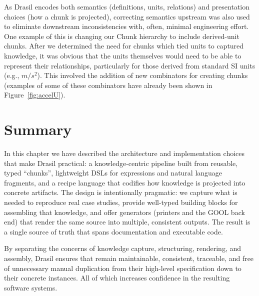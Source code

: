 As Drasil encodes both semantics (definitions, units, relations) and 
presentation choices (how a chunk is projected), correcting semantics upstream 
was also used to eliminate downstream inconsistencies with, often, minimal 
engineering effort. One example of this is changing our Chunk hierarchy to 
include derived-unit chunks. After we determined the need for  
chunks which tied units to captured knowledge, it was obvious that the units 
themselves would need to be able to represent their relationships, particularly 
for those derived from standard SI units (e.g., $m/s^2$). This involved the
addition of new combinators for creating  chunks (examples of 
some of these combinators have already been shown in Figure~\ref{fig:accelU}).


\section{Summary}
\label{sec:drasil_summary}

In this chapter we have described the architecture and implementation choices 
that make Drasil practical: a knowledge-centric pipeline built from reusable, 
typed ``chunks'', lightweight DSLs for expressions and natural language 
fragments, and a recipe language that codifies how knowledge is projected into 
concrete artifacts. The design is intentionally pragmatic: we capture what is 
needed to reproduce real case studies, provide well-typed building blocks for 
assembling that knowledge, and offer generators (printers and the GOOL back 
end) that render the same source into multiple, consistent outputs. The result 
is a single source of truth that spans documentation and executable code.

By separating the concerns of knowledge capture, structuring, rendering, and 
assembly, Drasil ensures that \sfs{} remain maintainable, consistent, 
traceable, and free of unnecessary manual duplication from their high-level 
specification down to their concrete instances. All of which increases 
confidence in the resulting software systems.

